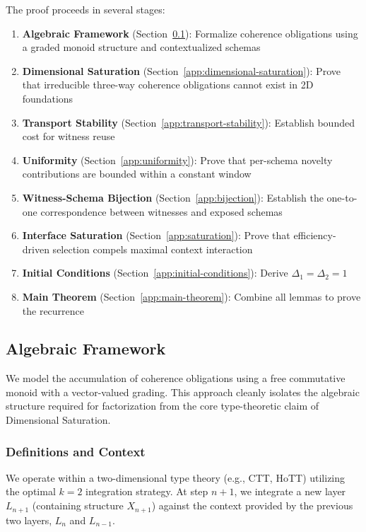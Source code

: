\documentclass[11pt]{article}
\theoremstyle{definition}
\theoremstyle{remark}
\begin{document}
The proof proceeds in several stages:
\begin{enumerate}
\item \textbf{Algebraic Framework} (Section~\ref{app:algebraic}): Formalize coherence obligations
using a graded monoid structure and contextualized schemas
\item \textbf{Dimensional Saturation} (Section~\ref{app:dimensional-saturation}): Prove that
irreducible three-way coherence obligations cannot exist in 2D foundations
\item \textbf{Transport Stability} (Section~\ref{app:transport-stability}): Establish bounded cost
for witness reuse
\item \textbf{Uniformity} (Section~\ref{app:uniformity}): Prove that per-schema novelty contributions
are bounded within a constant window
\item \textbf{Witness-Schema Bijection} (Section~\ref{app:bijection}): Establish the one-to-one
correspondence between witnesses and exposed schemas
\item \textbf{Interface Saturation} (Section~\ref{app:saturation}): Prove that efficiency-driven
selection compels maximal context interaction
\item \textbf{Initial Conditions} (Section~\ref{app:initial-conditions}): Derive $\Delta_1 = \Delta_2 = 1$
\item \textbf{Main Theorem} (Section~\ref{app:main-theorem}): Combine all lemmas to prove the
recurrence
\end{enumerate}

\subsection{Algebraic Framework}
\label{app:algebraic}

We model the accumulation of coherence obligations using a free commutative monoid with a
vector-valued grading. This approach cleanly isolates the algebraic structure required for factorization
from the core type-theoretic claim of Dimensional Saturation.

\subsubsection{Definitions and Context}

We operate within a two-dimensional type theory (e.g., CTT, HoTT) utilizing the optimal $k=2$
integration strategy. At step $n+1$, we integrate a new layer $L_{n+1}$ (containing structure $X_{n+1}$)
against the context provided by the previous two layers, $L_n$ and $L_{n-1}$.
\end{document}
